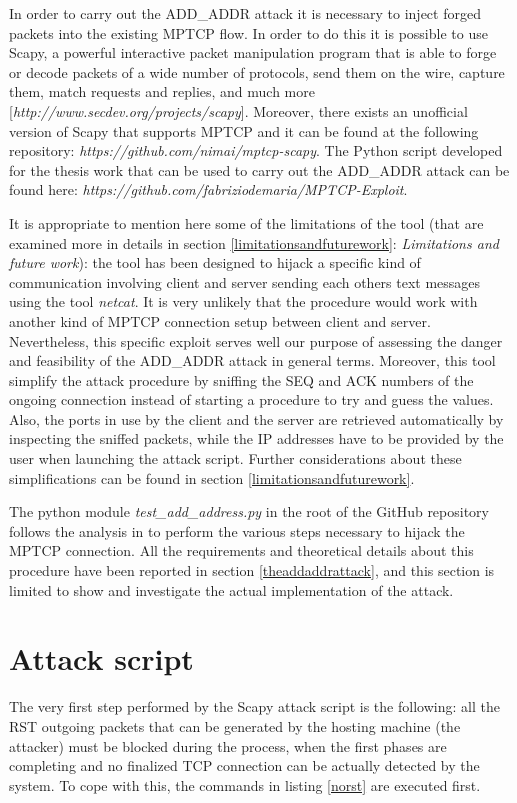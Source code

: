 In order to carry out the ADD\_ADDR attack it is necessary to inject forged packets into the existing MPTCP flow. In order to do this it is possible to use Scapy, a powerful interactive packet manipulation program that is able to forge or decode packets of a wide number of protocols, send them on the wire, capture them, match requests and replies, and much more [\textit{http://www.secdev.org/projects/scapy}]. Moreover, there exists an unofficial version of Scapy that supports MPTCP and it can be found at the following repository: \textit{https://github.com/nimai/mptcp-scapy}. The Python script developed for the thesis work that can be used to carry out the ADD\_ADDR attack can be found here: \textit{https://github.com/fabriziodemaria/MPTCP-Exploit}. 

It is appropriate to mention here some of the limitations of the tool (that are examined more in details in section \ref{limitationsandfuturework}: \textit{Limitations and future work}): the tool has been designed to hijack a specific kind of communication involving client and server sending each others text messages using the tool \textit{netcat}. It is very unlikely that the procedure would work with another kind of MPTCP connection setup between client and server. Nevertheless, this specific exploit serves well our purpose of assessing the danger and feasibility of the ADD\_ADDR attack in general terms.
Moreover, this tool simplify the attack procedure by sniffing the SEQ and ACK numbers of the ongoing connection instead of starting a procedure to try and guess the values. Also, the ports in use by the client and the server are retrieved automatically by inspecting the sniffed packets, while the IP addresses have to be provided by the user when launching the attack script. Further considerations about these simplifications can be found in section \ref{limitationsandfuturework}.

The python module \textit{test\_add\_address.py} in the root of the GitHub repository follows the analysis in  to perform the various steps necessary to hijack the MPTCP connection. All the requirements and theoretical details about this procedure have been reported in section \ref{theaddaddrattack}, and this section is limited to show and investigate the actual implementation of the attack.

\section{Attack script}
The very first step performed by the Scapy attack script is the following: all the RST outgoing packets that can be generated by the hosting machine (the attacker) must be blocked during the process, when the first phases are completing and no finalized TCP connection can be actually detected by the system. To cope with this, the commands in listing \ref{norst} are executed first.


